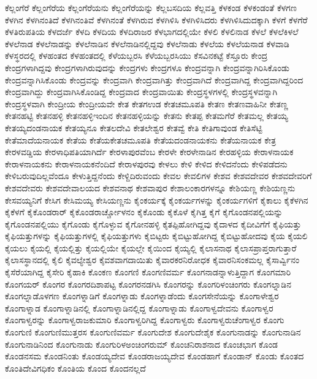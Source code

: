 {ಕೆಲ್ಲಂಗೆರೆ
ಕೆಲ್ಲಂಗೆರೆಯ
ಕೆಲ್ಲಂಗೆರೆಯನು
ಕೆಲ್ಲಂಗೆರೆಯನ್ನು
ಕೆಲ್ಲಬಸದಿಯ
ಕೆಲ್ಲವತ್ತಿ
ಕೆಳಕಂಡ
ಕೆಳಕಂಡಂತೆ
ಕೆಳಗಣ
ಕೆಳಗಿನ
ಕೆಳಗಿನಂತಿದೆ
ಕೆಳಗಿನಂತಿವೆ
ಕೆಳಗಿನಂತೆ
ಕೆಳಗಿರುವ
ಕೆಳಗಿಳಿಸಿ
ಕೆಳಗಿಳಿಸಿದರು
ಕೆಳಗಿಳಿಸಿದುದಕ್ಕಾಗಿ
ಕೆಳಗೆ
ಕೆಳಗೆರೆ
ಕೆಳತಿರುಪತಿಯ
ಕೆಳದರ್ಜೆ
ಕೆಳದಿ
ಕೆಳದಿಯ
ಕೆಳದಿರಾಜರ
ಕೆಳಭಾಗದಲ್ಲಿಯೇ
ಕೆಳಲಿ
ಕೆಳಲಿನಾಡ
ಕೆಳಲೆ
ಕೆಳಲೆಕಿಳಲೆ
ಕೆಳಲೆನಾಡ
ಕೆಳಲೆನಾಡನ್ನು
ಕೆಳಲೆನಾಡಿನ
ಕೆಳಲೆನಾಡಿನಲ್ಲಿದ್ದವು
ಕೆಳಲೆನಾಡು
ಕೆಳಲೆಯ
ಕೆಳಲೆಯನಾಡ
ಕೆಳವಾಡಿ
ಕೆಳಸ್ಥರದಲ್ಲಿ
ಕೆಳಹಂತದ
ಕೆಳಹಂತದಲ್ಲಿ
ಕೆಳೆಯಬ್ಬರಸಿ
ಕೆಳೆಯಬ್ಬರಸಿಯು
ಕೆಸವಿನಕಟ್ಟೆ
ಕೆಸ್ತೂರು
ಕೇಂದ್ರ
ಕೇಂದ್ರಗಳಾಗಿದ್ದವು
ಕೇಂದ್ರಗಳಾಗಿರುವುದನ್ನು
ಕೇಂದ್ರಗಳು
ಕೇಂದ್ರಗಳೂ
ಕೇಂದ್ರವನ್ನಾಗಿ
ಕೇಂದ್ರವನ್ನಾಗಿರಿಸಿಕೊಂಡು
ಕೇಂದ್ರವನ್ನಾಗಿಸಿಕೊಂಡು
ಕೇಂದ್ರವನ್ನು
ಕೇಂದ್ರವಾಗಿ
ಕೇಂದ್ರವಾಗಿತ್ತು
ಕೇಂದ್ರವಾಗಿದೆ
ಕೇಂದ್ರವಾಗಿದ್ದ
ಕೇಂದ್ರವಾಗಿದ್ದರಿಂದ
ಕೇಂದ್ರವಾಗಿದ್ದು
ಕೇಂದ್ರವಾಗಿಸಿಕೊಂಡಿದ್ದ
ಕೇಂದ್ರವಾದ
ಕೇಂದ್ರವಾಯಿತು
ಕೇಂದ್ರಸ್ಥಳಗಳಲ್ಲಿ
ಕೇಂದ್ರಸ್ಥಳವನ್ನಾಗಿ
ಕೇಂದ್ರಸ್ಥಳವಾಗಿ
ಕೇಂದ್ರೀಯ
ಕೇಂದ್ರೀಯವೇ
ಕೇತ
ಕೇತಗಉಡ
ಕೇತಚಮೂಪತಿ
ಕೇತಣ
ಕೇತಣವಾಹಿನೀ
ಕೇತಣ್ಣ
ಕೇತನಹಟ್ಟಿ
ಕೇತನಹಳ್ಳಿ
ಕೇತನಹಳ್ಳಿಇಂದಿನ
ಕೇತನಹಳ್ಳಿಯನ್ನು
ಕೇತನು
ಕೇತಪ್ಪ
ಕೇತಮಗೆರೆ
ಕೇತಮಲ್ಲ
ಕೇತಯ್ಯ
ಕೇತಯ್ಯದಂಡನಾಯಕ
ಕೇತಯ್ಯನೂ
ಕೇತಲದೇವಿ
ಕೇತಲೇಶ್ವರ
ಕೇತವ್ವೆ
ಕೇತಿ
ಕೇತಿಗಾವುಂಡ
ಕೇತಿಸೆಟ್ಟಿ
ಕೇತೆಮಾದೆಯನಾಯಕ
ಕೇತೆಯ
ಕೇತೆಯಕೇತಚಮೂಪತಿ
ಕೇತೆಯದಂಡನಾಯಕನು
ಕೇತೆಯನಾಯಕ
ಕೇತ್ರ
ಕೇರಳವಡ್ಡಿಯ
ಕೇರಳಾಧಿಪತಿಯಾಗಿರ್ದೆ
ಕೇರಳಾಪುರವೆಂಬ
ಕೇರಳೇ
ಕೇರಳೇನಾಡಿನ
ಕೇರಹಳ್ಳಿಯ
ಕೇರಾಳನಾಯಕ
ಕೇರಾಳನಾಯಕನು
ಕೇರಾಳನಾಯಕನೆಂದಿದೆ
ಕೇರಾಳಪುರವು
ಕೇಳಲು
ಕೇಳಿ
ಕೇಳಿದ
ಕೇಳಿದನೆಂದು
ಕೇಳಿಪಡೆದನು
ಕೇಳಿಬರುವುದಿಲ್ಲವೆಂದೂ
ಕೇಳುತ್ತಿದ್ದನೆಂದು
ಕೇಳ್ದಿದಿರುವಂದು
ಕೇವಲ
ಕೇವಲಿಗಳ
ಕೇಶವ
ಕೇಶವದೇವರ
ಕೇಶವದೇವರಿಗೆ
ಕೇಶವದೇವರು
ಕೇಶವದೇವಾಲಯದ
ಕೇಶವನಾಥ
ಕೇಶವಾಪುರ
ಕೇಶಾಲಂಕಾರಗಳನ್ನೂ
ಕೇಶಿಯಣ್ಣ
ಕೇಶಿಯಣ್ಣನು
ಕೇಸವಯ್ಯನಿಗೆ
ಕೇಸಿಗ
ಕೇಸಿಮಯ್ಯ
ಕೇಸಿಯಣ್ಣನು
ಕೈಂಕರ್ಯಕ್ಕೆ
ಕೈಂಕರ್ಯಗಳನ್ನು
ಕೈಂಕರ್ಯಗಳಿಗೆ
ಕೈಕಾಲು
ಕೈಕೆಳಗಿನ
ಕೈಕೆಳಗೆ
ಕೈಕೊಂಡರಾರ್
ಕೈಕೊಂಡರಾರ್ಚ್ಚೋಳನಂ
ಕೈಕೊಂಡು
ಕೈಕೊಳೆ
ಕೈಗಿತ್ತ
ಕೈಗೆ
ಕೈಗೊಂಡನಪಲ್ಲಿಯನ್ನು
ಕೈಗೊಂಡನಪಲ್ಲಿಯು
ಕೈಗೊಂಡು
ಕೈಗೊಳ್ಳುವ
ಕೈಗೋನಹಳ್ಳಿ
ಕೈತಪ್ಪಿಹೋಗಿದ್ದವು
ಕೈದಾಳದ
ಕೈದೀವಿಗೆಗೆ
ಕೈಫಿಯತ್ತು
ಕೈಫಿಯತ್ತುಗಳನ್ನು
ಕೈಫಿಯತ್ತುಗಳಲ್ಲಿ
ಕೈಫಿಯತ್ತುಗಳು
ಕೈಬಿಟ್ಟರು
ಕೈಬಿಟ್ಟುಹೋಗಿದ್ದ
ಕೈಬಿಟ್ಟುಹೋದವು
ಕೈಯ
ಕೈಯಲಿ
ಕೈಯಲು
ಕೈಯಲ್ಲಿ
ಕೈಯಲ್ಲಿತ್ತು
ಕೈಯಲ್ಲಿಯೇ
ಕೈಯಲ್ಲೇ
ಕೈಯಿಂದ
ಕೈಯ್ಯಲ್ಲಿ
ಕೈಲಾಸನಾಥ
ಕೈಲಾಸಪ್ರಾಪ್ತರಾಗುತ್ತಾರೆ
ಕೈಲಾಸಸ್ಥಾನದಲ್ಲಿ
ಕೈಲಿ
ಕೈವಲ್ಯೇಶ್ವರ
ಕೈವಶವಾಗದಾಯಿತು
ಕೈವಾರಕರನಿರೋಧಕ
ಕೈವಾರನಿಸಂಕಮಲ್ಲ
ಕೈಸಾರ್ವ್ವಿನಂ
ಕೈಸೆರೆಯಾಗಿದ್ದ
ಕೈಸೇರಿ
ಕೈಹಾಕಿ
ಕೊಂಕಣ
ಕೊಂಗಣಿ
ಕೊಂಗಣಿವರ್ಮ
ಕೊಂಗನಾಡನ್ನಾಳುತ್ತಿದ್ದಾಗ
ಕೊಂಗಮಾರಿ
ಕೊಂಗಯರ್
ಕೊಂಗರ
ಕೊಂಗರದಿಶಾಪಟ್ಟ
ಕೊಂಗರನಡಗಿಸಿ
ಕೊಂಗರನ್ನು
ಕೊಂಗರಿಳಂಚಿಂಗರು
ಕೊಂಗಲ್ನಾಡಿನ
ಕೊಂಗಲ್ನಾಡೊಳಗಣ
ಕೊಂಗಳ್ನಾಡಿಗೆ
ಕೊಂಗಳ್ನಾಡು
ಕೊಂಗಳ್ನಾಡೆಂದು
ಕೊಂಗಸೇನೆಯನ್ನು
ಕೊಂಗಾಳೇಶ್ವರ
ಕೊಂಗಾಳ್ನಾಡ
ಕೊಂಗಾಳ್ನಾಡಿನಲ್ಲಿ
ಕೊಂಗಾಳ್ನಾಡಿನಲ್ಲಿದ್ದ
ಕೊಂಗಾಳ್ನಾಡು
ಕೊಂಗಾಳ್ವದೇವನು
ಕೊಂಗಾಳ್ವರ
ಕೊಂಗಾಳ್ವರನ್ನು
ಕೊಂಗಾಳ್ವರಾಜಕುಮಾರಿ
ಕೊಂಗಾಳ್ವರಿಗಿದ್ದ
ಕೊಂಗಾಳ್ವರು
ಕೊಂಗಾಳ್ವರುಚೆಂಗಾಳ್ವರ
ಕೊಂಗು
ಕೊಂಗುಣಿ
ಕೊಂಗುಣಿಮುತ್ತರಸ
ಕೊಂಗುಣಿವರ್ಮ
ಕೊಂಗುದೇಶ
ಕೊಂಗುದೇಶೈಕ
ಕೊಂಗುನಾಡನ್ನು
ಕೊಂಗುನಾಡಿನ
ಕೊಂಗುನಾಡಿನಿಂದ
ಕೊಂಗುನಾಡು
ಕೊಂಗುರಿಳಅಂಚಿಂಗರುಮ್
ಕೊಂಚನಿರಾಶನಾದ
ಕೊಂಚಭಾಗ
ಕೊಂಡ
ಕೊಂಡನಸಮ
ಕೊಂಡನಿಂತು
ಕೊಂಡಯ್ಯದೇವ
ಕೊಂಡರಾಜಯ್ಯದೇವ
ಕೊಂಡಹಾಗೆ
ಕೊಂಡಾನ್
ಕೊಂಡು
ಕೊಂತದ
ಕೊಂತಿದೇವಿಗಧಿಕಂ
ಕೊಂತಿಯ
ಕೊಂದ
ಕೊಂದನಲ್ಲದೆ
}

